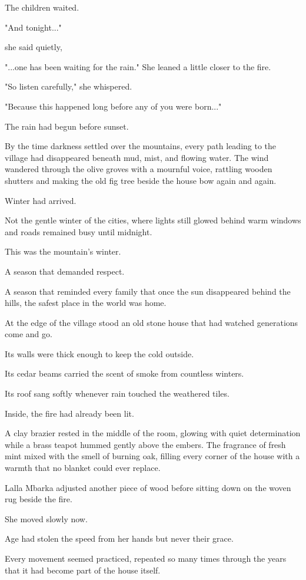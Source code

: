 \documentclass[12pt,openany]{book}
\begin{document}
The children waited.

"And tonight..."

she said quietly,

"...one has been waiting for the rain."
She leaned a little closer to the fire.

"So listen carefully," she whispered.

"Because this happened long before any of you were born..."

The rain had begun before sunset.

By the time darkness settled over the mountains, every path leading to the village had disappeared beneath mud, mist, and flowing water. The wind wandered through the olive groves with a mournful voice, rattling wooden shutters and making the old fig tree beside the house bow again and again.

Winter had arrived.

Not the gentle winter of the cities, where lights still glowed behind warm windows and roads remained busy until midnight.

This was the mountain's winter.

A season that demanded respect.

A season that reminded every family that once the sun disappeared behind the hills, the safest place in the world was home.

At the edge of the village stood an old stone house that had watched generations come and go.

Its walls were thick enough to keep the cold outside.

Its cedar beams carried the scent of smoke from countless winters.

Its roof sang softly whenever rain touched the weathered tiles.

Inside, the fire had already been lit.

A clay brazier rested in the middle of the room, glowing with quiet determination while a brass teapot hummed gently above the embers. The fragrance of fresh mint mixed with the smell of burning oak, filling every corner of the house with a warmth that no blanket could ever replace.

Lalla Mbarka adjusted another piece of wood before sitting down on the woven rug beside the fire.

She moved slowly now.

Age had stolen the speed from her hands but never their grace.

Every movement seemed practiced, repeated so many times through the years that it had become part of the house itself.
\end{document}
